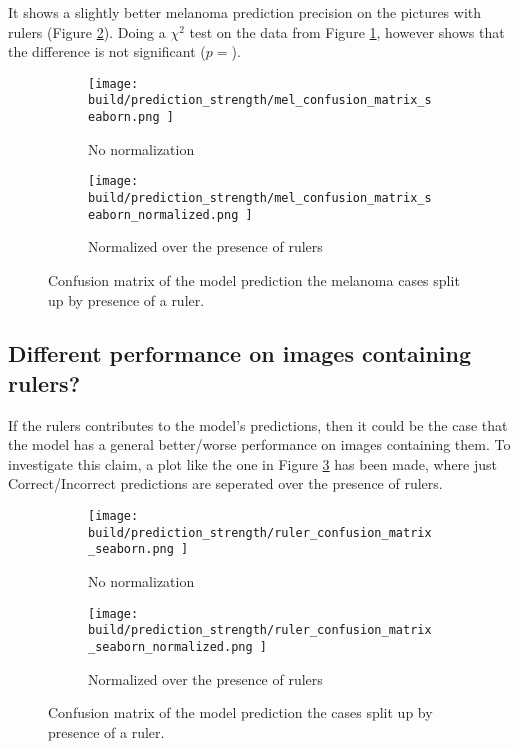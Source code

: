 It shows a slightly better melanoma prediction precision on the pictures with rulers (Figure \ref{fig:prediction_strength_mel_normalized}).
Doing a $\chi^2$ test on the data from Figure \ref{fig:prediction_strength_mel_not_normalized},
however shows that the difference is not significant ($p=$).


\begin{figure}[h]
    \centering
    \begin{subfigure}[h]{0.45\textwidth}
        \texttt{[image: 
            build/prediction\_strength/mel\_confusion\_matrix\_seaborn.png
        ]}
        \caption{No normalization}
        \label{fig:prediction_strength_mel_not_normalized}
    \end{subfigure}
    \begin{subfigure}[h]{0.45\textwidth}
        \texttt{[image: 
            build/prediction\_strength/mel\_confusion\_matrix\_seaborn\_normalized.png
        ]}
        \caption{Normalized over the presence of rulers}
        \label{fig:prediction_strength_mel_normalized}
    \end{subfigure}
    \caption{Confusion matrix of the model prediction the melanoma cases split up by presence of a ruler.}
    \label{fig:prediction_strength_mel}
\end{figure}

\subsection{Different performance on images containing rulers?}
If the rulers contributes to the model's predictions,
then it could be the case that the model has a general better/worse performance on images containing them.
To investigate this claim, a plot like the one in Figure \ref{fig:prediction_strength_mel} has been made,
where just Correct/Incorrect predictions are seperated over the presence of rulers.

\begin{figure}
    \centering
    \begin{subfigure}[h]{0.45\textwidth}
        \texttt{[image: 
            build/prediction\_strength/ruler\_confusion\_matrix\_seaborn.png
        ]}
        \caption{No normalization}
        \label{fig:prediction_strength_ruler_not_normalized}
    \end{subfigure}
    \begin{subfigure}[h]{0.45\textwidth}
        \texttt{[image: 
            build/prediction\_strength/ruler\_confusion\_matrix\_seaborn\_normalized.png
        ]}
        \caption{Normalized over the presence of rulers}
        \label{fig:prediction_strength_ruler_normalized}
    \end{subfigure}
    \caption{Confusion matrix of the model prediction the cases split up by presence of a ruler.}
    \label{fig:prediction_strength_ruler}
\end{figure}


